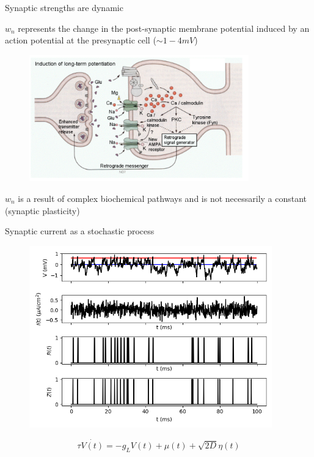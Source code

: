 \documentclass[aspectratio=169]{beamer}
\begin{document}
\begin{frame}{Synaptic strengths are dynamic}

$w_{n}$ represents the change in the post-synaptic membrane potential induced by an action potential at the presynaptic cell ($\sim 1-4 \si{mV}$)

\begin{figure}
\centering
\includegraphics[width=95mm]{figure-12}
\end{figure}

$w_{n}$ is a result of complex biochemical pathways and is not necessarily a constant (synaptic plasticity)
\end{frame}

\begin{frame}{Synaptic current as a stochastic process}


\begin{figure}
\centering
\includegraphics[width=105mm]{figure-23}
\end{figure}

\begin{equation*}
\tau\dot{V(t)} = -g_{L}V(t) + \mu(t) + \sqrt{2D}\eta(t)
\end{equation*}

\end{frame}
\end{document}
